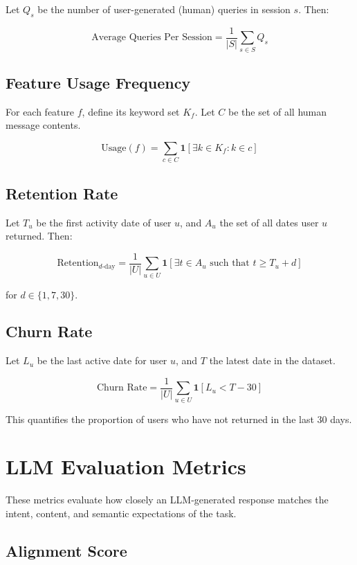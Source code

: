 \documentclass[12pt]{article}
\begin{document}
Let \( Q_s \) be the number of user-generated (human) queries in session \( s \). Then:

\[
\text{Average Queries Per Session} = \frac{1}{|S|} \sum_{s \in S} Q_s
\]

\subsection*{Feature Usage Frequency}

For each feature \( f \), define its keyword set \( K_f \). Let \( C \) be the set of all human message contents.

\[
\text{Usage}(f) = \sum_{c \in C} \mathbf{1}\left[\exists k \in K_f: k \in c \right]
\]

\subsection*{Retention Rate}

Let \( T_u \) be the first activity date of user \( u \), and \( A_u \) the set of all dates user \( u \) returned. Then:

\[
\text{Retention}_{d\text{-day}} = \frac{1}{|U|} \sum_{u \in U} \mathbf{1}\left[ \exists t \in A_u \text{ such that } t \geq T_u + d \right]
\]

for \( d \in \{1, 7, 30\} \).

\subsection*{Churn Rate}

Let \( L_u \) be the last active date for user \( u \), and \( T \) the latest date in the dataset.

\[
\text{Churn Rate} = \frac{1}{|U|} \sum_{u \in U} \mathbf{1}[L_u < T - 30]
\]

This quantifies the proportion of users who have not returned in the last 30 days.

\section*{LLM Evaluation Metrics}

These metrics evaluate how closely an LLM-generated response matches the intent, content, and semantic expectations of the task.

\subsection*{Alignment Score}
\end{document}
